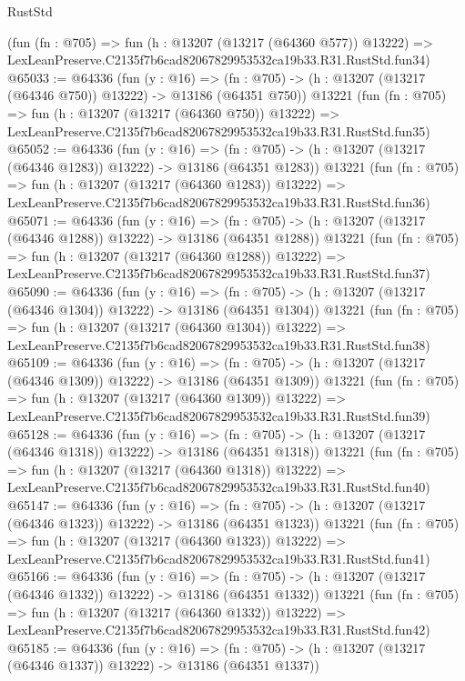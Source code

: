 \begin{lexlean}{RustStd}
\begin{coremodule}
    (fun (fn : @705) =>
    fun (h : @13207 (@13217 (@64360 @577)) @13222) =>
    LexLeanPreserve.C2135f7b6cad82067829953532ca19b33.R31.RustStd.fun34)
@65033 := @64336
    (fun (y : @16) =>
    (fn : @705) -> (h : @13207 (@13217 (@64346 @750)) @13222) -> @13186 (@64351 @750))
    @13221
    (fun (fn : @705) =>
    fun (h : @13207 (@13217 (@64360 @750)) @13222) =>
    LexLeanPreserve.C2135f7b6cad82067829953532ca19b33.R31.RustStd.fun35)
@65052 := @64336
    (fun (y : @16) =>
    (fn : @705) -> (h : @13207 (@13217 (@64346 @1283)) @13222) -> @13186 (@64351 @1283))
    @13221
    (fun (fn : @705) =>
    fun (h : @13207 (@13217 (@64360 @1283)) @13222) =>
    LexLeanPreserve.C2135f7b6cad82067829953532ca19b33.R31.RustStd.fun36)
@65071 := @64336
    (fun (y : @16) =>
    (fn : @705) -> (h : @13207 (@13217 (@64346 @1288)) @13222) -> @13186 (@64351 @1288))
    @13221
    (fun (fn : @705) =>
    fun (h : @13207 (@13217 (@64360 @1288)) @13222) =>
    LexLeanPreserve.C2135f7b6cad82067829953532ca19b33.R31.RustStd.fun37)
@65090 := @64336
    (fun (y : @16) =>
    (fn : @705) -> (h : @13207 (@13217 (@64346 @1304)) @13222) -> @13186 (@64351 @1304))
    @13221
    (fun (fn : @705) =>
    fun (h : @13207 (@13217 (@64360 @1304)) @13222) =>
    LexLeanPreserve.C2135f7b6cad82067829953532ca19b33.R31.RustStd.fun38)
@65109 := @64336
    (fun (y : @16) =>
    (fn : @705) -> (h : @13207 (@13217 (@64346 @1309)) @13222) -> @13186 (@64351 @1309))
    @13221
    (fun (fn : @705) =>
    fun (h : @13207 (@13217 (@64360 @1309)) @13222) =>
    LexLeanPreserve.C2135f7b6cad82067829953532ca19b33.R31.RustStd.fun39)
@65128 := @64336
    (fun (y : @16) =>
    (fn : @705) -> (h : @13207 (@13217 (@64346 @1318)) @13222) -> @13186 (@64351 @1318))
    @13221
    (fun (fn : @705) =>
    fun (h : @13207 (@13217 (@64360 @1318)) @13222) =>
    LexLeanPreserve.C2135f7b6cad82067829953532ca19b33.R31.RustStd.fun40)
@65147 := @64336
    (fun (y : @16) =>
    (fn : @705) -> (h : @13207 (@13217 (@64346 @1323)) @13222) -> @13186 (@64351 @1323))
    @13221
    (fun (fn : @705) =>
    fun (h : @13207 (@13217 (@64360 @1323)) @13222) =>
    LexLeanPreserve.C2135f7b6cad82067829953532ca19b33.R31.RustStd.fun41)
@65166 := @64336
    (fun (y : @16) =>
    (fn : @705) -> (h : @13207 (@13217 (@64346 @1332)) @13222) -> @13186 (@64351 @1332))
    @13221
    (fun (fn : @705) =>
    fun (h : @13207 (@13217 (@64360 @1332)) @13222) =>
    LexLeanPreserve.C2135f7b6cad82067829953532ca19b33.R31.RustStd.fun42)
@65185 := @64336
    (fun (y : @16) =>
    (fn : @705) -> (h : @13207 (@13217 (@64346 @1337)) @13222) -> @13186 (@64351 @1337))

\end{coremodule}
\end{lexlean}
